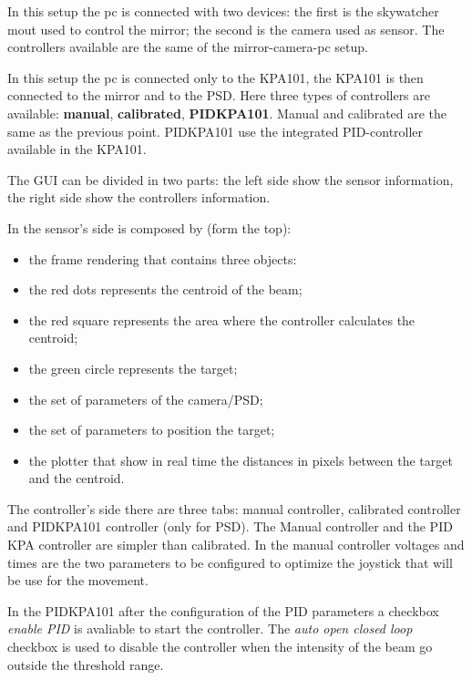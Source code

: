 In this setup the pc is connected with two devices: the first is
the skywatcher mout used to control the mirror; the second is the camera used as
sensor. The controllers available are the same of the mirror-camera-pc setup.

In this setup the pc is connected only to the KPA101, the KPA101 is
then connected to the mirror and to the PSD. Here three types of controllers are available: \textbf{manual}, \textbf{calibrated}, \textbf{PIDKPA101}. Manual and calibrated are the same as the previous point. PIDKPA101 use the integrated PID-controller available in the KPA101.



The GUI can be divided in two parts: the left side show the sensor
information, the right side show the controllers information.

In the sensor's side is composed by (form the top):

\begin{itemize}
  \itemsep1pt\parskip0pt
  \item
        the frame rendering that contains three objects:
  \item
        the red dots represents the centroid of the beam;
  \item
        the red square represents the area where the controller calculates the
        centroid;
  \item
        the green circle represents the target;
  \item
        the set of parameters of the camera/PSD;
  \item
        the set of parameters to position the target;
  \item
        the plotter that show in real time the distances in pixels between the
        target and the centroid.
\end{itemize}

The controller's side there are three tabs: manual controller, calibrated
controller and PIDKPA101 controller (only for PSD). The Manual
controller and the PID KPA controller are simpler than calibrated. In the manual
controller voltages and times are the two parameters to be configured to optimize the joystick that will be use for the movement.

In the PIDKPA101 after the configuration of the PID parameters a checkbox \emph{enable PID}
is avaliable to start the controller. The \emph{auto open closed loop} checkbox is used to
disable the controller when the intensity of the beam go outside the
threshold range.

